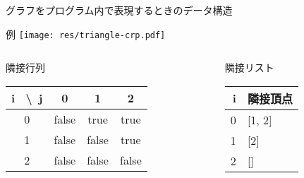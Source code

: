 \documentclass[dvipdfmx]{beamer}
\begin{document}
\begin{frame}{\insertsection}
  グラフをプログラム内で表現するときのデータ構造
  \begin{block}{例}
    \centering
    \texttt{[image: res/triangle-crp.pdf]}
  \end{block}
  \begin{columns}[t]
    \begin{column}{0.48\textwidth}
      \begin{block}{隣接行列}
        \begin{table}
          \begin{tabular}{c|ccc}
            i \ \textbackslash \ j & 0 & 1 & 2 \\ \hline
            0 & false & true & true \\
            1 & false & false & true \\
            2 & false & false & false
          \end{tabular}
        \end{table}
      \end{block}
    \end{column}
    \begin{column}{0.48\textwidth}
      \begin{block}{隣接リスト}
        \begin{table}
          \begin{tabular}{r|l}
            i & 隣接頂点 \\ \hline
            0 & [1, 2] \\
            1 & [2] \\
            2 & []
          \end{tabular}
        \end{table}
      \end{block}
    \end{column}
  \end{columns}
\end{frame}
\end{document}
